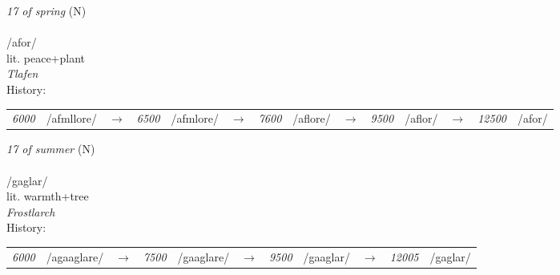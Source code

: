 \vspace{15pt}
\begin{nopagebreak}
 \textit{17 of spring} (N)\\
\\
\noindent /{}{\textprimstress}afor/\\
\noindent lit. peace+plant\\
\noindent \textit{Tlafen}\\


\noindent History:

\vspace{-0pt}
\hspace{40pt}
\begin{tabular}{ccc}
\textit{6000} & /{}afmllore/&$\rightarrow$ & \textit{6500} & /{}afmlore/&$\rightarrow$ & \textit{7600} & /{}aflore/&$\rightarrow$ & \textit{9500} & /{}aflor/&$\rightarrow$ & \textit{12500} & /{}afor/& \\
\end{tabular}

\vspace{20pt}\hline

\end{nopagebreak}
\filbreak



\vspace{15pt}
\begin{nopagebreak}
 \textit{17 of summer} (N)\\
\\
\noindent /g{\textprimstress}aglar/\\
\noindent lit. warmth+tree\\
\noindent \textit{Frostlarch}\\


\noindent History:

\vspace{-0pt}
\hspace{40pt}
\begin{tabular}{ccc}
\textit{6000} & /agaaglare/&$\rightarrow$ & \textit{7500} & /gaaglare/&$\rightarrow$ & \textit{9500} & /gaaglar/&$\rightarrow$ & \textit{12005} & /gaglar/& \\
\end{tabular}

\vspace{20pt}\hline

\end{nopagebreak}
\filbreak



